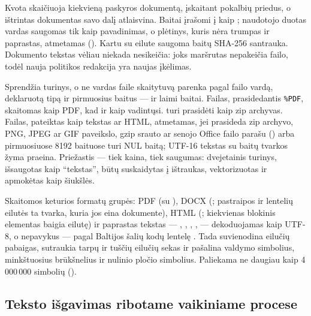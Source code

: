 Kvota skaičiuoja kiekvieną paskyros dokumentą, įskaitant pokalbių priedus, o ištrintas
dokumentas savo dalį atlaisvina. Baitai įrašomi į  kaip
; naudotojo duotas vardas saugomas tik kaip pavadinimas, o plėtinys,
kuris nėra trumpas ir paprastas, atmetamas (). Kartu su eilute saugoma
baitų SHA-256 santrauka. Dokumento tekstas vėliau niekada nesikeičia: joks maršrutas nepakeičia
failo, todėl nauja politikos redakcija yra naujas įkėlimas.

\begin{codebox}{Sprendžia turinys, o ne vardas}
 faile  skaitytuvą parenka pagal failo vardą,
deklaruotą tipą ir pirmuosius baitus --- ir laimi baitai. Failas, prasidedantis
\texttt{\%PDF}, skaitomas kaip PDF, kad ir kaip vadintųsi.  turi prasidėti kaip zip
archyvas. Failas, pateiktas kaip tekstas ar HTML, atmetamas, jei prasideda zip archyvo, PNG,
JPEG ar GIF paveikslo, gzip srauto ar senojo Office failo parašu () arba
pirmuosiuose 8192 baituose turi NUL baitą; UTF-16 tekstas su baitų tvarkos žyma praeina.
Priežastis --- tiek kaina, tiek saugumas: dvejetainis turinys, išsaugotas kaip
\enquote{tekstas}, būtų suskaidytas į ištraukas, vektorizuotas ir apmokėtas kaip šiukšlės.
\end{codebox}

Skaitomos keturios formatų grupės: PDF (su ), DOCX (; pastraipos ir
lentelių eilutės ta tvarka, kuria jos eina dokumente), HTML (; kiekvienas
blokinis elementas baigia eilutę) ir paprastas tekstas --- , ,
, ,  --- dekoduojamas kaip UTF-8, o nepavykus --- pagal
Baltijos šalių kodų lentelę . Tada  suvienodina eilučių
pabaigas, sutraukia tarpų ir tuščių eilučių sekas ir pašalina valdymo simbolius, minkštuosius
brūkšnelius ir nulinio pločio simbolius. Paliekama ne daugiau kaip 4\,000\,000 simbolių
().

\subsection{Teksto išgavimas ribotame vaikiniame procese}\label{sec:company:sandbox}

